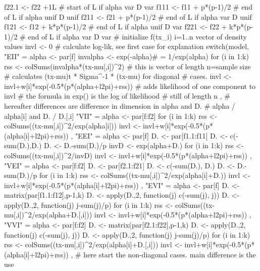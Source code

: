 \begin{Schunk}
\begin{Soutput}
{    f22.1 <- f22 +1L # start of L if alpha var   D var
    f111 <- f11 +   p*(p-1)/2 # end of L if alpha unif  D unif
    f211 <- f21 +   p*(p-1)/2 # end of L if alpha var   D unif
    f121 <- f12 + k*p*(p-1)/2 # end of L if alpha unif  D var
    f221 <- f22 + k*p*(p-1)/2 # end of L if alpha var   D var
    # initialize f(tx_i) i=1..n  vector of density values
    invl <- 0
    # calculate log-lik, see first case for explanation
    switch(model,
    "EII" = {
        alpha <- par[f]
        invalpha <- exp(-alpha)# = 1/exp(alpha)
        for (i in 1:k) {
            rss <- colSums(invalpha*(tx-mu[,i])^2)
            # this is vector of length n=sample size
            # calculates (tx-mu)t * Sigma^-1 * (tx-mu) for diagonal
            # cases.
            invl <- invl+w[i]*exp(-0.5*(p*(alpha+l2pi)+rss))
            # adds likelihood of one component to invl
            # the formula in exp() is the log of likelihood
            # still of length n
        }
    },
    # hereafter differences are difference in dimension in alpha and D.
    # alpha / alpha[i] and D. / D.[,i]
    "VII" = {
        alpha <- par[f:f2]
        for (i in 1:k) {
            rss <- colSums((tx-mu[,i])^2/exp(alpha[i]))
            invl <- invl+w[i]*exp(-0.5*(p*(alpha[i]+l2pi)+rss))
        }
    },
    "EEI" = {
        alpha <- par[f]
        D. <- par[f1.1:f11]
        D. <- c(-sum(D.),D.)
        D. <- D.-sum(D.)/p
        invD <- exp(alpha+D.)
        for (i in 1:k) {
            rss <- colSums((tx-mu[,i])^2/invD)
            invl <- invl+w[i]*exp(-0.5*(p*(alpha+l2pi)+rss))
        }
    },
    "VEI" = {
        alpha <- par[f:f2]
        D. <- par[f2.1:f21]
        D. <- c(-sum(D.), D.)
        D. <- D.-sum(D.)/p
        for (i in 1:k) {
            rss <- colSums((tx-mu[,i])^2/exp(alpha[i]+D.))
            invl <- invl+w[i]*exp(-0.5*(p*(alpha[i]+l2pi)+rss))
        }
    },
    "EVI" = {
        alpha <- par[f]
        D. <- matrix(par[f1.1:f12],p-1,k)
        D. <- apply(D.,2, function(j) c(-sum(j), j))
        D. <- apply(D.,2, function(j) j-sum(j)/p)
        for (i in 1:k) {
            rss <- colSums((tx-mu[,i])^2/exp(alpha+D.[,i]))
            invl <- invl+w[i]*exp(-0.5*(p*(alpha+l2pi)+rss))
        }
    },
    "VVI" = {
        alpha <- par[f:f2]
        D. <- matrix(par[f2.1:f22],p-1,k)
        D. <- apply(D.,2, function(j) c(-sum(j), j))
        D. <- apply(D.,2, function(j) j-sum(j)/p)
        for (i in 1:k) {
            rss <- colSums((tx-mu[,i])^2/exp(alpha[i]+D.[,i]))
            invl <- invl+w[i]*exp(-0.5*(p*(alpha[i]+l2pi)+rss))
        }
    },
    # here start the non-diagonal cases. main difference is the use
}
\end{Soutput}
\end{Schunk}
